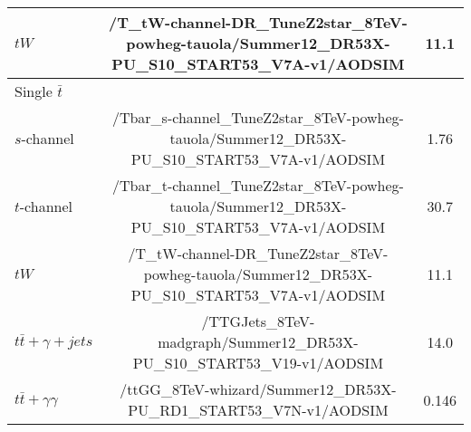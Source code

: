 \documentclass[landscape]{article}
\begin{document}
\begin{small}
\begin{center}
\begin{tabular}{ | l | c | c | }
      \-$tW$ & /T\_tW-channel-DR\_TuneZ2star\_8TeV-powheg-tauola/Summer12\_DR53X-PU\_S10\_START53\_V7A-v1/AODSIM & 11.1 \\
      \hline
      Single $\bar{t}$ & & \\
      \-$s$-channel & /Tbar\_s-channel\_TuneZ2star\_8TeV-powheg-tauola/Summer12\_DR53X-PU\_S10\_START53\_V7A-v1/AODSIM & 1.76 \\
      \-$t$-channel & /Tbar\_t-channel\_TuneZ2star\_8TeV-powheg-tauola/Summer12\_DR53X-PU\_S10\_START53\_V7A-v1/AODSIM & 30.7 \\
      \-$tW$ & /T\_tW-channel-DR\_TuneZ2star\_8TeV-powheg-tauola/Summer12\_DR53X-PU\_S10\_START53\_V7A-v1/AODSIM & 11.1 \\
      \hline
      $t\bar{t} + \gamma + jets$ & /TTGJets\_8TeV-madgraph/Summer12\_DR53X-PU\_S10\_START53\_V19-v1/AODSIM & 14.0 \\
      \hline
      $t\bar{t} + \gamma\gamma$ & /ttGG\_8TeV-whizard/Summer12\_DR53X-PU\_RD1\_START53\_V7N-v1/AODSIM & 0.146 \\
      \hline \hline
    \end{tabular}


  \end{center}
  
\end{small}
\end{document}
